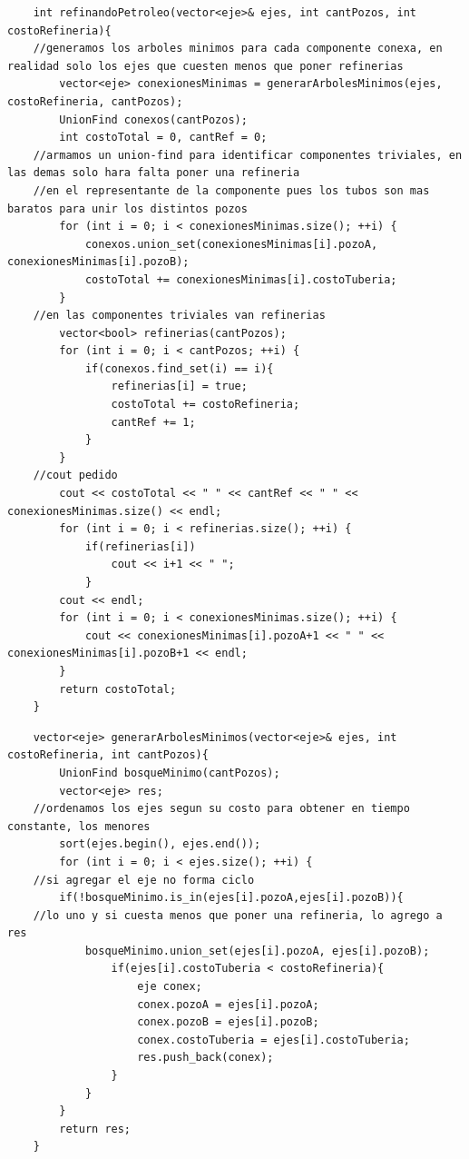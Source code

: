 	\begin{codesnippet}
	\begin{verbatim}
    int refinandoPetroleo(vector<eje>& ejes, int cantPozos, int costoRefineria){
    //generamos los arboles minimos para cada componente conexa, en realidad solo los ejes que cuesten menos que poner refinerias
        vector<eje> conexionesMinimas = generarArbolesMinimos(ejes, costoRefineria, cantPozos);
        UnionFind conexos(cantPozos);
        int costoTotal = 0, cantRef = 0;
    //armamos un union-find para identificar componentes triviales, en las demas solo hara falta poner una refineria
    //en el representante de la componente pues los tubos son mas baratos para unir los distintos pozos
        for (int i = 0; i < conexionesMinimas.size(); ++i) {
            conexos.union_set(conexionesMinimas[i].pozoA, conexionesMinimas[i].pozoB);
            costoTotal += conexionesMinimas[i].costoTuberia;
        }
    //en las componentes triviales van refinerias
        vector<bool> refinerias(cantPozos);
        for (int i = 0; i < cantPozos; ++i) {
            if(conexos.find_set(i) == i){
                refinerias[i] = true;
                costoTotal += costoRefineria;
                cantRef += 1;
            }
        }
    //cout pedido
        cout << costoTotal << " " << cantRef << " " << conexionesMinimas.size() << endl;
        for (int i = 0; i < refinerias.size(); ++i) {
            if(refinerias[i])
                cout << i+1 << " ";
            }
        cout << endl;
        for (int i = 0; i < conexionesMinimas.size(); ++i) {
            cout << conexionesMinimas[i].pozoA+1 << " " << conexionesMinimas[i].pozoB+1 << endl;
        }
        return costoTotal;
    }
	\end{verbatim}
	\end{codesnippet}

	\begin{codesnippet}
	\begin{verbatim}
    vector<eje> generarArbolesMinimos(vector<eje>& ejes, int costoRefineria, int cantPozos){
        UnionFind bosqueMinimo(cantPozos);
        vector<eje> res;
    //ordenamos los ejes segun su costo para obtener en tiempo constante, los menores
        sort(ejes.begin(), ejes.end());
        for (int i = 0; i < ejes.size(); ++i) {
    //si agregar el eje no forma ciclo
        if(!bosqueMinimo.is_in(ejes[i].pozoA,ejes[i].pozoB)){
    //lo uno y si cuesta menos que poner una refineria, lo agrego a res
            bosqueMinimo.union_set(ejes[i].pozoA, ejes[i].pozoB);
                if(ejes[i].costoTuberia < costoRefineria){
                    eje conex;
                    conex.pozoA = ejes[i].pozoA;
                    conex.pozoB = ejes[i].pozoB;
                    conex.costoTuberia = ejes[i].costoTuberia;
                    res.push_back(conex);
                }
            }
        }
        return res;
    }
	\end{verbatim}
	\end{codesnippet}

